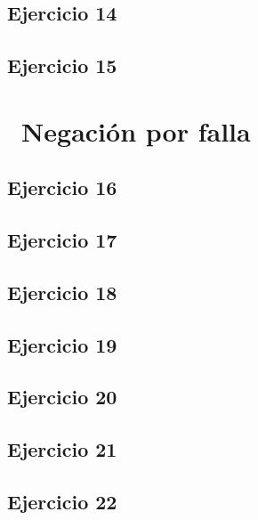 \documentclass[10pt,a4paper]{article}
\begin{document}
\subsection{Ejercicio 14}
\subsection{Ejercicio 15}
\section*{\ Negación por falla}
\subsection{Ejercicio 16}
\subsection{Ejercicio 17}
\subsection{Ejercicio 18}
\subsection{Ejercicio 19}

\subsection{Ejercicio 20}
\subsection{Ejercicio 21}
\subsection{Ejercicio 22}
\end{document}
